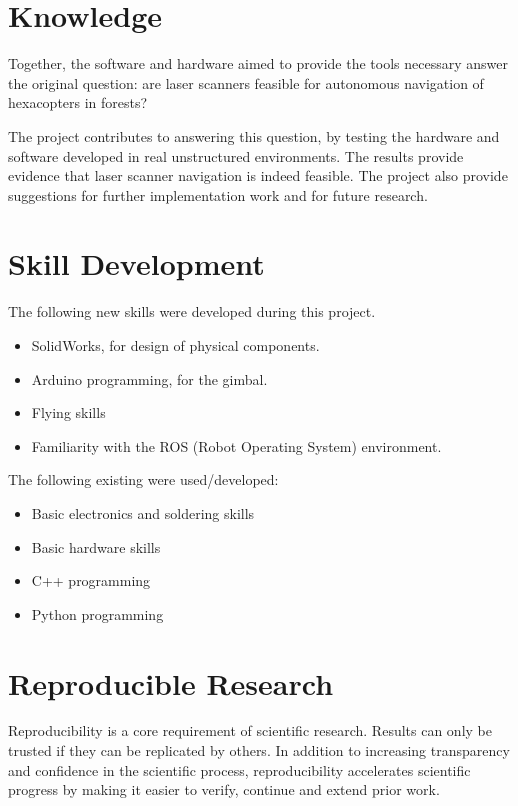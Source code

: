 \documentclass[12pt,oneside,a4paper]{book}
\begin{document}
\section{Knowledge}
\label{sec:knowledge}

Together, the software and hardware aimed to provide the tools
necessary answer the original question: are laser scanners feasible
for autonomous navigation of hexacopters in forests?

The project contributes to answering this question, by testing the
hardware and software developed in real unstructured environments. The
results provide evidence that laser scanner navigation is indeed
feasible. The project also provide suggestions for further
implementation work and for future research.

\section{Skill Development}
\label{sec:skill-development}

The following new skills were developed during this project.

\begin{itemize}
\item SolidWorks, for design of physical components.
\item Arduino programming, for the gimbal.
\item Flying skills
\item Familiarity with the ROS (Robot Operating System) environment.
 \end{itemize}
 
The following existing were used/developed:
\begin{itemize}
\item Basic electronics and soldering skills
\item Basic hardware skills
\item C++ programming
\item Python programming
\end{itemize}

\section{Reproducible Research}
\label{sec:repr-rese}

Reproducibility is a core requirement of scientific research. Results
can only be trusted if they can be replicated by others. In addition
to increasing transparency and confidence in the scientific process,
reproducibility accelerates scientific progress by making it easier to
verify, continue and extend prior work.
\end{document}
